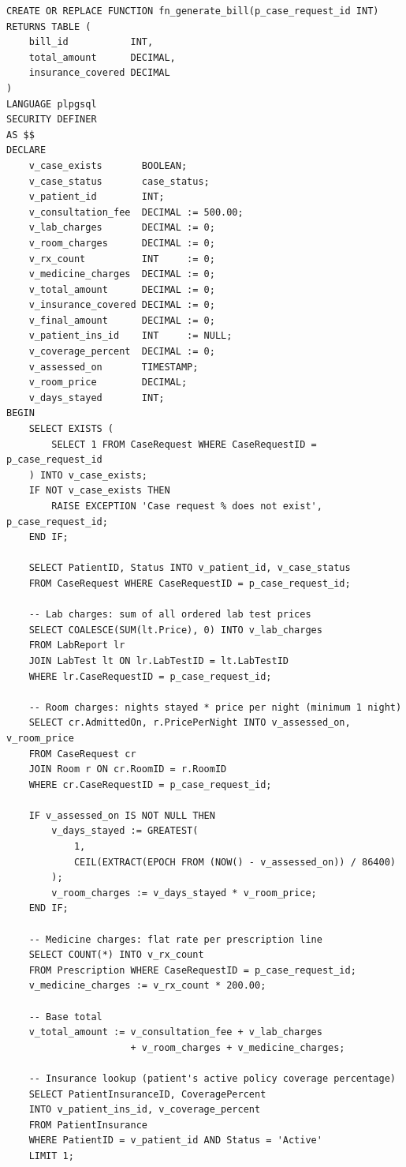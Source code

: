 \documentclass{article}
\begin{document}
\begin{lstlisting}
CREATE OR REPLACE FUNCTION fn_generate_bill(p_case_request_id INT)
RETURNS TABLE (
    bill_id           INT,
    total_amount      DECIMAL,
    insurance_covered DECIMAL
)
LANGUAGE plpgsql
SECURITY DEFINER
AS $$
DECLARE
    v_case_exists       BOOLEAN;
    v_case_status       case_status;
    v_patient_id        INT;
    v_consultation_fee  DECIMAL := 500.00;
    v_lab_charges       DECIMAL := 0;
    v_room_charges      DECIMAL := 0;
    v_rx_count          INT     := 0;
    v_medicine_charges  DECIMAL := 0;
    v_total_amount      DECIMAL := 0;
    v_insurance_covered DECIMAL := 0;
    v_final_amount      DECIMAL := 0;
    v_patient_ins_id    INT     := NULL;
    v_coverage_percent  DECIMAL := 0;
    v_assessed_on       TIMESTAMP;
    v_room_price        DECIMAL;
    v_days_stayed       INT;
BEGIN
    SELECT EXISTS (
        SELECT 1 FROM CaseRequest WHERE CaseRequestID = p_case_request_id
    ) INTO v_case_exists;
    IF NOT v_case_exists THEN
        RAISE EXCEPTION 'Case request % does not exist', p_case_request_id;
    END IF;

    SELECT PatientID, Status INTO v_patient_id, v_case_status
    FROM CaseRequest WHERE CaseRequestID = p_case_request_id;

    -- Lab charges: sum of all ordered lab test prices
    SELECT COALESCE(SUM(lt.Price), 0) INTO v_lab_charges
    FROM LabReport lr
    JOIN LabTest lt ON lr.LabTestID = lt.LabTestID
    WHERE lr.CaseRequestID = p_case_request_id;

    -- Room charges: nights stayed * price per night (minimum 1 night)
    SELECT cr.AdmittedOn, r.PricePerNight INTO v_assessed_on, v_room_price
    FROM CaseRequest cr
    JOIN Room r ON cr.RoomID = r.RoomID
    WHERE cr.CaseRequestID = p_case_request_id;

    IF v_assessed_on IS NOT NULL THEN
        v_days_stayed := GREATEST(
            1,
            CEIL(EXTRACT(EPOCH FROM (NOW() - v_assessed_on)) / 86400)
        );
        v_room_charges := v_days_stayed * v_room_price;
    END IF;

    -- Medicine charges: flat rate per prescription line
    SELECT COUNT(*) INTO v_rx_count
    FROM Prescription WHERE CaseRequestID = p_case_request_id;
    v_medicine_charges := v_rx_count * 200.00;

    -- Base total
    v_total_amount := v_consultation_fee + v_lab_charges
                      + v_room_charges + v_medicine_charges;

    -- Insurance lookup (patient's active policy coverage percentage)
    SELECT PatientInsuranceID, CoveragePercent
    INTO v_patient_ins_id, v_coverage_percent
    FROM PatientInsurance
    WHERE PatientID = v_patient_id AND Status = 'Active'
    LIMIT 1;


\end{lstlisting}
\end{document}
